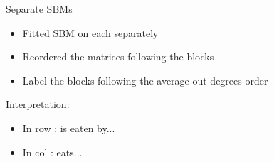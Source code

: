 \documentclass[compress,10pt]{beamer}
\begin{document}
\begin{frame}{Separate  SBMs}


   
   
 \begin{itemize}
  \item Fitted SBM on each separately
  \item Reordered the matrices following the blocks
   \item Label the blocks following the  average out-degrees order
   \end{itemize}

   
Interpretation:
  \begin{itemize}
   \item In row : is eaten by... 
   \item In col : eats... 
  \end{itemize}
  
\end{frame}
\end{document}
